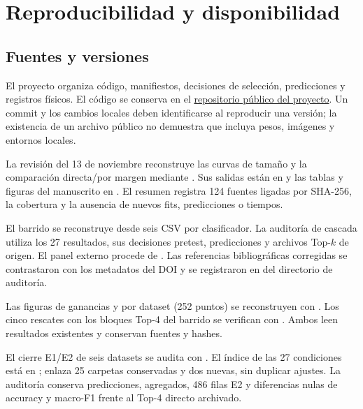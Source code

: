 \chapter{Reproducibilidad y disponibilidad}\label{app:reproducibilidad}

\section{Fuentes y versiones}
El proyecto organiza código, manifiestos, decisiones de selección, predicciones y registros físicos. El código se conserva en el \href{https://github.com/Joafp/concatenacion-descriptores-texturas}{repositorio público del proyecto}. Un commit y los cambios locales deben identificarse al reproducir una versión; la existencia de un archivo público no demuestra que incluya pesos, imágenes y entornos locales.

La revisión del 13 de noviembre reconstruye las curvas de tamaño y la comparación directa/por margen mediante . Sus salidas están en  y las tablas y figuras del manuscrito en . El resumen registra 124 fuentes ligadas por SHA-256, la cobertura y la ausencia de nuevos fits, predicciones o tiempos.

El barrido se reconstruye desde seis CSV por clasificador. La auditoría de cascada utiliza los 27 resultados, sus decisiones pretest, predicciones y archivos Top-\(k\) de origen. El panel externo procede de . Las referencias bibliográficas corregidas se contrastaron con los metadatos del DOI y se registraron en  del directorio de auditoría.

Las figuras de ganancias y por dataset (252 puntos) se reconstruyen con . Los cinco rescates con los bloques Top-4 del barrido se verifican con . Ambos leen resultados existentes y conservan fuentes y hashes.

El cierre E1/E2 de seis datasets se audita con . El índice de las 27 condiciones está en ; enlaza 25 carpetas conservadas y dos nuevas, sin duplicar ajustes. La auditoría  conserva predicciones, agregados, 486 filas E2 y diferencias nulas de accuracy y macro-F1 frente al Top-4 directo archivado.

